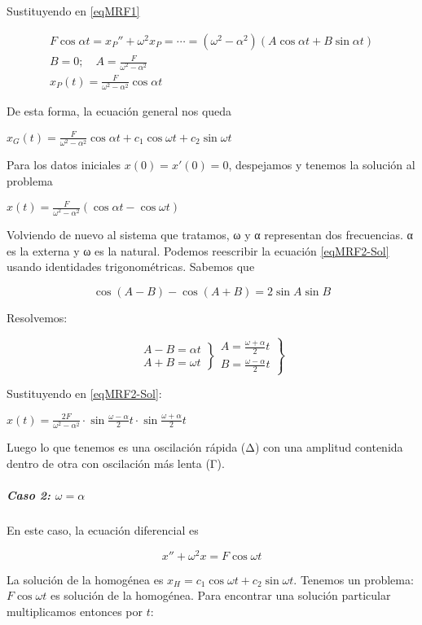 \documentclass[nochap]{apuntes}
\begin{document}
Sustituyendo en \eqref{eqMRF1}

\begin{gather*}
 F\cos αt = x_P'' + ω^2x_P = \dotsb = (ω^2-α^2)\left(A\cos αt + B\sin αt\right) \\
 B = 0;\quad A= \frac{F}{ω^2-α^2} \\
 x_P(t) = \frac{F}{ω^2-α^2}\cos αt
\end{gather*}

De esta forma, la ecuación general nos queda

\( x_G(t) = \frac{F}{ω^2-α^2}\cos αt + c_1 \cos ωt + c_2 \sin ωt \)

Para los datos iniciales $x(0) = x'(0) = 0$, despejamos y tenemos la solución al problema

\(\label{eqMRF2-Sol} x(t) = \frac{F}{ω^2-α^2}\left(\cos αt - \cos ωt\right) \)

Volviendo de nuevo al sistema que tratamos, ω y α representan dos frecuencias. α es la externa y ω es la natural. Podemos reescribir la ecuación \eqref{eqMRF2-Sol} usando identidades trigonométricas. Sabemos que

\[ \cos (A-B) - \cos(A+B) = 2\sin A \sin B \]

Resolvemos:

\[ \left.\begin{matrix}A - B = αt \\ A + B = ωt \end{matrix}\right\}
\left.\begin{matrix}A = \frac{ω+α}{2}t \\ B = \frac{ω-α}{2}t\end{matrix}\right\} \]

Sustituyendo en \eqref{eqMRF2-Sol}:

\( x(t) = \frac{2F}{ω^2-α^2} ·\sin \frac{ω-α}{2}t · \sin \frac{ω+α}{2}t  \)

Luego lo que tenemos es una oscilación rápida (Δ) con una amplitud contenida dentro de otra con oscilación más lenta (Γ).


\subparagraph{Caso 2: $ω=α$}

En este caso, la ecuación diferencial es 

\[ x'' + ω^2 x = F\cos ωt \]

La solución de la homogénea es $x_H = c_1 \cos ωt + c_2 \sin ωt$. Tenemos un problema: $F\cos ωt$ es solución de la homogénea. Para encontrar una solución particular multiplicamos entonces por $t$:
\end{document}
